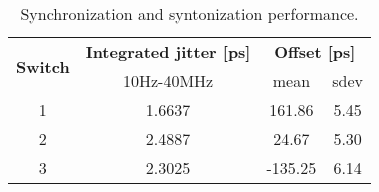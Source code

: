\begin{table}[!t]
\caption{Synchronization and syntonization performance.}
\centering
\begin{tabular}{| c | c |c | c |}          \hline
\multirow{2}{*}{\textbf{Switch}}& 
\textbf{Integrated jitter [ps]}& 
\multicolumn{2}{|c|}{\textbf{Offset [ps]}}  \\ \cline{2-4}
            & 10Hz-40MHz& mean &  sdev    \\ \hline
1           & 1.6637    &  161.86       &  5.45            \\ \hline
2           & 2.4887    &  24.67        &  5.30            \\ \hline
3           & 2.3025    & -135.25       &  6.14            \\ \hline

\end{tabular}
\label{tab:freqTransfer}
\end{table}

